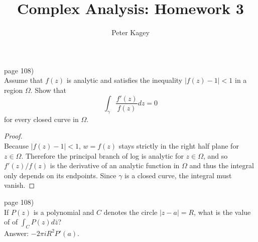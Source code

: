 \documentclass{article}
\newenvironment{problem}[2][Problem]{\begin{trivlist}
\item[\hskip \labelsep {\bfseries #1}\hskip \labelsep {\bfseries #2.}]}{\end{trivlist}}
\begin{document}
\title{Complex Analysis: Homework 3}
\author{Peter Kagey}

\maketitle

\begin{problem}{6} (page 108) \\
  Assume that $f(z)$ is analytic and satisfies the inequality $|f(z)-1| < 1$ in
  a region $\Omega$. Show that \[
    \int_\gamma \frac{f'(z)}{f(z)}dz = 0
  \] for every closed curve in $\Omega$.
\end{problem}

\begin{proof} \text{} \\
  Because $|f(z) - 1| < 1$, $w = f(z)$ stays strictly in the right half plane
  for $z \in \Omega$.
  Therefore the principal branch of log is analytic for $z \in \Omega$, and so
  $f'(z)/f(z)$ is the derivative of an analytic function in $\Omega$ and thus
  the integral only depends on its endpoints. Since $\gamma$ is a closed curve,
  the integral must vanish.
\end{proof}
\pagebreak

\begin{problem}{7} (page 108) \\
  If $P(z)$ is a polynomial and $C$ denotes the circle $|z-a| = R$,
  what is the value of of $\displaystyle \int_C P(z) d\bar{z}$?\\
  Answer: $-2\pi iR^2P'(a)$.
\end{problem}
\end{document}
